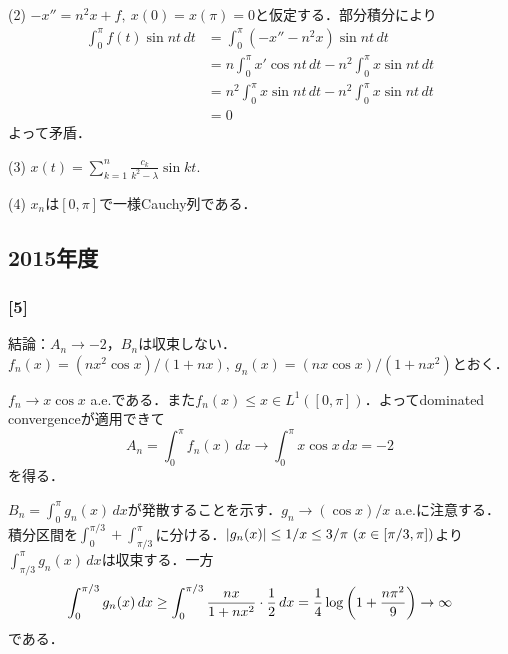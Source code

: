 \documentclass[a4j]{ltjsarticle}
\newcommand{\1}{\mathbbm{1}}
\numberwithin{equation}{section}
\theoremstyle{definition}
\begin{document}
(2) $-x''=n^2x+f,\ x(0)=x(\pi)=0$と仮定する．部分積分により
\begin{align}
    \int_{0}^{\pi}f(t)\sin nt\,dt&=\int_{0}^{\pi}(-x''-n^2x)\sin nt\,dt\\
    &=n\int_{0}^{\pi}x'\cos nt\,dt-n^2\int_{0}^{\pi}x\sin nt\,dt\\
    &=n^2\int_{0}^{\pi}x\sin nt\,dt-n^2\int_{0}^{\pi}x\sin nt\,dt\\
    &=0
\end{align}
よって矛盾．

(3) $x(t)=\sum_{k=1}^n \frac{c_k}{k^2-\lambda}\sin kt$.

(4) $x_n$は$[0,\pi]$で一様Cauchy列である．
\subsection{2015年度}
\subsubsection*{[5]}
結論：$A_n\to -2$，$B_n$は収束しない．$f_n(x)=(nx^2\cos x)/(1+nx),\ g_n(x)=(nx\cos x)/(1+nx^2)$とおく．

$f_n\to x\cos x$ a.e.である．また$f_n(x)\leq x\in L^1([0,\pi])$．よってdominated convergenceが適用できて
\begin{equation}
    A_n=\int_{0}^{\pi}f_n(x)\,dx\to \int_{0}^{\pi}x\cos x\,dx=-2
\end{equation}
を得る．

$B_n=\int_{0}^{\pi}g_n(x)\,dx$が発散することを示す．$g_n\to (\cos x)/x$ a.e.に注意する．積分区間を$\int_{0}^{\pi/3}+\int_{\pi/3}^{\pi}$に分ける．$\abs{g_n(x)}\leq 1/x\leq 3/\pi\ (x\in[\pi/3,\pi])$より$\int_{\pi/3}^{\pi}g_n(x)\,dx$は収束する．一方
\begin{equation}
    \int_{0}^{\pi/3}g_n(x)\,dx\geq \int_{0}^{\pi/3}\frac{nx}{1+nx^2}\cdot\frac{1}{2}\,dx=\frac{1}{4}\log\qty(1+\frac{n\pi^2}{9})\to\infty 
\end{equation}
である．
\end{document}
